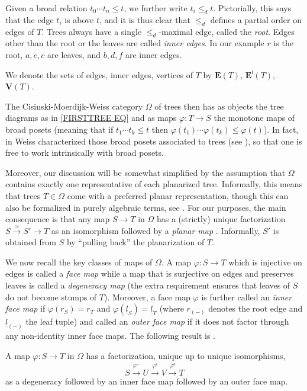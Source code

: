 \documentclass[a4paper,10pt
]{article}%
\begin{document}
Given a broad relation $t_0 \cdots t_n \leq t$,
we further write $t_i \leq_d t$.
Pictorially, this says that the edge $t_i$ is above $t$,
and it is thus clear that $\leq_d$ defines a partial order on edges of $T$.
Trees always have a single $\leq_d$-maximal edge, called the \textit{root}. Edges other than the root or the leaves are called \textit{inner edges}. In our example $r$ is the root, $a,e,c$ are leaves, and $b,d,f$ are inner edges. 

We denote the sets of edges, inner edges, vertices of $T$ by 
$\boldsymbol{E}(T)$, $\boldsymbol{E}^{\mathsf{i}}(T)$,
$\boldsymbol{V}(T)$.

The Cisinski-Moerdijk-Weiss category $\Omega$ of trees then has as objects the tree diagrams as in \eqref{FIRSTTREE EQ}
and as maps $\varphi \colon T \to S$ the monotone maps of broad posets
(meaning that if $t_1 \cdots t_k \leq t$ then
$\varphi(t_1) \cdots \varphi(t_k) \leq \varphi(t)$).
In fact, in \cite{Wei12} Weiss characterized 
those broad posets associated to trees (see \cite[Defs. 5.1 and 5.9]{Per17}),
so that one is free to work intrinsically with broad posets.

Moreover, our discussion will be somewhat simplified by the assumption that $\Omega$
contains exactly one representative of each planarized tree.
Informally, this means that trees $T \in \Omega$
come with a preferred planar representation,
though this can also be formalized in purely algebraic terms, see \cite[\S 3.1]{BP17}.
For our purposes, the main consequence is that any map 
$S \to T$ in $\Omega$ has a (strictly) unique factorization
$S \xrightarrow{\simeq} S' \to T$ as an isomorphism followed by a \textit{planar map} \cite[Prop. 3.21]{BP17}. 
Informally, $S'$ is obtained from $S$
by ``pulling back'' the planarization of $T$.

We now recall the key classes of maps of $\Omega$.
A map $\varphi \colon S \to T$ which is injective on edges is called a \textit{face map}
while a map that is surjective on edges and preserves leaves is called a \textit{degeneracy map}
(the extra requirement ensures that leaves of $S$ do not become stumps of $T$).
Moreover, a face map $\varphi$ is further called an \textit{inner face map}
if $\varphi(r_S) = r_T$ and 
$\varphi(\underline{l}_S) = \underline{l}_T$ 
(where $r_{(-)}$ denotes the root edge and $\underline{l}_{(-)}$ the leaf tuple)
and called an \textit{outer face map} if it does not factor through any non-identity inner face maps.
The following result is \cite[Cor. 3.32]{BP17}.
\begin{proposition}\label{UNIQUEFACT PROP}
	A map $\varphi \colon S \to T$ in $\Omega$ has a factorization, unique up to unique isomorphisms,
\[
	S \xrightarrow{\varphi^{-}}
	U \xrightarrow{\varphi^{i}}
	V \xrightarrow{\varphi^{o}}
	T	
\]
as a degeneracy followed by an inner face map followed by an outer face map.
\end{proposition}
\end{document}
